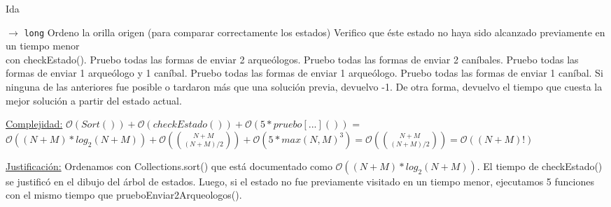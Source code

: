 \begin{algorithm}[H]
\caption{Ida}
\begin{algorithmic}[1]
   $\to $ \texttt{long}
  \State Ordeno la orilla origen (para comparar correctamente los estados)
  \State Verifico que éste estado no haya sido alcanzado previamente en un tiempo menor \\ con checkEstado().
  \State
  \State Pruebo todas las formas de enviar 2 arqueólogos.
  \State Pruebo todas las formas de enviar 2 caníbales.
  \State Pruebo todas las formas de enviar 1 arqueólogo y 1 caníbal.
  \State Pruebo todas las formas de enviar 1 arqueólogo.
  \State Pruebo todas las formas de enviar 1 caníbal.
  \State
  \State Si ninguna de las anteriores fue posible o tardaron más que una solución previa, devuelvo -1.
  \State De otra forma, devuelvo el tiempo que cuesta la mejor solución a partir del estado actual.
 \EndProcedure
\end{algorithmic}
\underline{Complejidad:}
 $\mathcal{O}(Sort()) + \mathcal{O}(checkEstado()) + \mathcal{O}(5*pruebo[...]())$ = $\mathcal{O}((N+M)*log_2(N+M)) + \mathcal{O}(\binom{N+M}{(N+M)/2}) + \mathcal{O}(5*max(N,M)^3) = \mathcal{O}(\binom{N+M}{(N+M)/2}) = \mathcal{O}((N+M)!)$

 \vspace*{5mm}
 \underline{Justificación:}
 Ordenamos con Collections.sort() que está documentado como $\mathcal{O}((N+M)*log_2(N+M))$. El tiempo de checkEstado() se justificó en el dibujo del árbol de estados. Luego, si el estado no fue previamente visitado en un tiempo menor, ejecutamos 5 funciones con el mismo tiempo que prueboEnviar2Arqueologos().

\end{algorithm}

